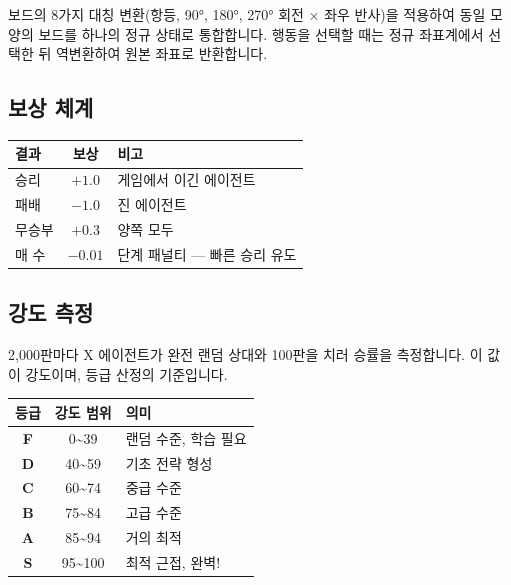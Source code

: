 \documentclass[11pt,a4paper]{article}
\begin{document}
보드의 8가지 대칭 변환(항등, 90°, 180°, 270° 회전 \(\times\) 좌우 반사)을 적용하여 동일 모양의 보드를 하나의 정규 상태로 통합합니다. 행동을 선택할 때는 정규 좌표계에서 선택한 뒤 역변환하여 원본 좌표로 반환합니다.

\subsection{보상 체계}

\begin{center}
\renewcommand{\arraystretch}{1.4}
\begin{tabular}{|l|c|p{6cm}|}
\hline
\rowcolor{tableheader}
\textbf{결과} & \textbf{보상} & \textbf{비고} \\
\hline
승리 & \(+1.0\) & 게임에서 이긴 에이전트 \\
\hline
패배 & \(-1.0\) & 진 에이전트 \\
\hline
무승부 & \(+0.3\) & 양쪽 모두 \\
\hline
매 수 & \(-0.01\) & 단계 패널티 — 빠른 승리 유도 \\
\hline
\end{tabular}
\end{center}

\subsection{강도 측정}

2,000판마다 X 에이전트가 완전 랜덤 상대와 100판을 치러 승률을 측정합니다. 이 값이  강도이며, 등급 산정의 기준입니다.

\begin{center}
\renewcommand{\arraystretch}{1.4}
\begin{tabular}{|c|c|p{6cm}|}
\hline
\rowcolor{tableheader}
\textbf{등급} & \textbf{강도 범위} & \textbf{의미} \\
\hline
\textcolor{gradeF}{\textbf{F}} & 0\textasciitilde39 & 랜덤 수준, 학습 필요 \\
\hline
\textcolor{gradeD}{\textbf{D}} & 40\textasciitilde59 & 기초 전략 형성 \\
\hline
\textcolor{gradeC}{\textbf{C}} & 60\textasciitilde74 & 중급 수준 \\
\hline
\textcolor{gradeB}{\textbf{B}} & 75\textasciitilde84 & 고급 수준 \\
\hline
\textcolor{gradeA}{\textbf{A}} & 85\textasciitilde94 & 거의 최적 \\
\hline
\textcolor{gradeS}{\textbf{S}} & 95\textasciitilde100 & 최적 근접, 완벽! \\
\hline
\end{tabular}
\end{center}
\end{document}
